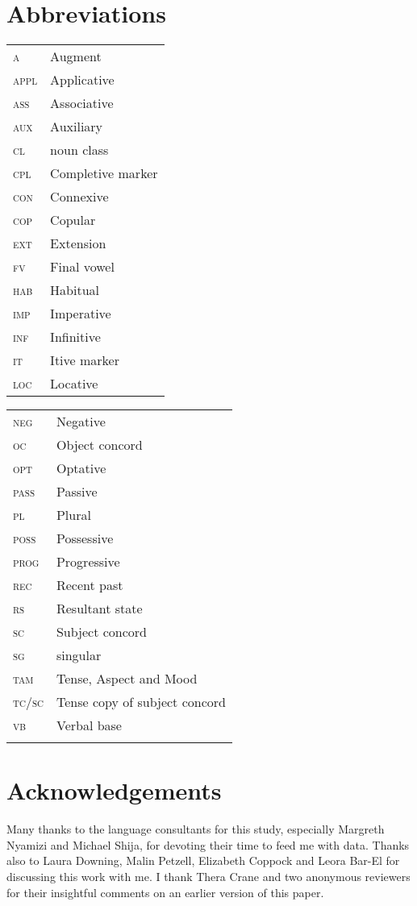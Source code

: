 \documentclass[output=paper,newtxmath,modfonts,nonflat,draftmode]{langsci/langscibook}
\begin{document}
\section*{Abbreviations} 
\noindent\begin{tabularx}{.5\textwidth}{@{}>{\scshape}lQ@{}}
a & Augment\\
appl & Applicative\\
ass & Associative\\
aux & Auxiliary\\
cl & noun class\\
cpl & Completive marker\\
con & Connexive\\
cop & Copular\\
ext & Extension\\
fv & Final vowel\\
hab & Habitual\\
imp & Imperative\\
inf & Infinitive\\
it & Itive marker\\
loc & Locative\\
\end{tabularx}%
\begin{tabularx}{.5\textwidth}{@{}>{\scshape}ll@{}}
neg & Negative\\
oc & Object concord\\
opt & Optative\\
pass & Passive\\
pl & Plural\\
poss & Possessive\\
prog & Progressive\\
rec & Recent past\\
rs & Resultant state\\
sc & Subject concord\\
sg & singular\\
tam & Tense, Aspect and Mood\\
tc/sc & Tense copy of subject concord\\
vb & Verbal base\\
\\
\end{tabularx}

\section*{Acknowledgements}
Many thanks to the language consultants for this study, especially Margreth Nyamizi and Michael Shija, for devoting their time to feed me with data. Thanks also to Laura Downing, Malin Petzell, Elizabeth Coppock and Leora Bar-El for discussing this work with me. I thank Thera Crane and two anonymous reviewers for their insightful comments on an earlier version of this paper.  

{\sloppy\printbibliography[heading=subbibliography,notkeyword=this]}
\end{document}
